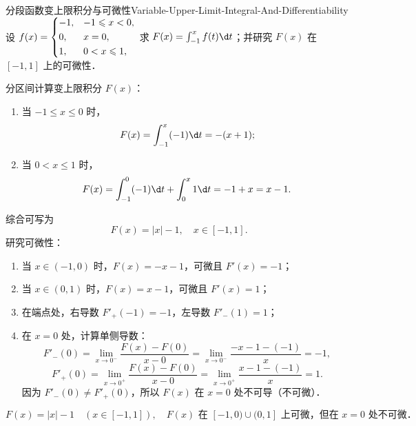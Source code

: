 \begin{problem}{分段函数变上限积分与可微性}{Variable-Upper-Limit-Integral-And-Differentiability}
    设 $f(x) = \begin{dcases} -1, & -1 \leqslant x < 0, \\ 0, & x = 0, \\ 1, & 0 < x \leqslant 1, \end{dcases}$ 求 $F(x) = \int_{-1}^x f(t) \d t$；并研究 $F(x)$ 在 $[-1, 1]$ 上的可微性．
\end{problem}

\begin{solution}
    分区间计算变上限积分 $F(x)$：
    \begin{enumerate}
        \item 当 $-1 \leqslant x \leqslant 0$ 时，
              \begin{equation}
                  F(x) = \int_{-1}^x (-1)\d t = -(x + 1);
              \end{equation}
        \item 当 $0 < x \leqslant 1$ 时，
              \begin{equation}
                  F(x) = \int_{-1}^0 (-1)\d t + \int_0^x 1\d t = -1 + x = x - 1.
              \end{equation}
    \end{enumerate}
    综合可写为
    \begin{equation}
        F(x) = |x| - 1, \quad x \in [-1, 1].
    \end{equation}
    研究可微性：
    \begin{enumerate}
        \item 当 $x \in (-1, 0)$ 时，$F(x) = -x - 1$，可微且 $F'(x) = -1$；
        \item 当 $x \in (0, 1)$ 时，$F(x) = x - 1$，可微且 $F'(x) = 1$；
        \item 在端点处，右导数 $F'_+(-1) = -1$，左导数 $F'_-(1) = 1$；
        \item 在 $x = 0$ 处，计算单侧导数：
              \begin{equation}
                  F'_-(0) = \lim_{x\to 0^-} \frac{F(x) - F(0)}{x - 0} = \lim_{x\to 0^-} \frac{-x - 1 - (-1)}{x} = -1,
              \end{equation}
              \begin{equation}
                  F'_+(0) = \lim_{x\to 0^+} \frac{F(x) - F(0)}{x - 0} = \lim_{x\to 0^+} \frac{x - 1 - (-1)}{x} = 1.
              \end{equation}
              因为 $F'_-(0) \neq F'_+(0)$，所以 $F(x)$ 在 $x = 0$ 处不可导（不可微）．
    \end{enumerate}
    \begin{equation}
        \boxed{F(x) = |x| - 1 \quad (x \in [-1, 1]), \quad F(x) \text{ 在 } [-1, 0) \cup (0, 1] \text{ 上可微，但在 } x = 0 \text{ 处不可微．}}
    \end{equation}
\end{solution}

